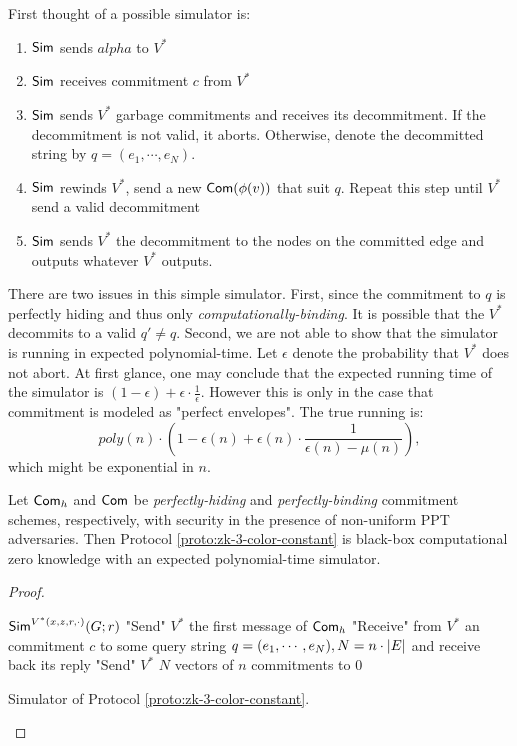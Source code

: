 \\ \\
First thought of a possible simulator is:
\begin{enumerate}
\item ${\sf Sim}$ sends $alpha$ to $V^*$
\item ${\sf Sim}$ receives commitment $c$ from $V^*$
\item ${\sf Sim}$ sends $V^*$ garbage commitments and receives its decommitment. If the decommitment is not valid, it aborts. Otherwise, denote the decommitted string by 
$q=(e_1,\cdots,e_N)$.
\item ${\sf Sim}$ rewinds $V^*$, send a new ${\sf Com}(\phi(v))$ that suit $q$. Repeat this step until $V^*$ send a valid decommitment
\item ${\sf Sim}$ sends $V^*$ the decommitment to the nodes on the committed edge and outputs whatever $V^*$ outputs.
\end{enumerate}
There are two issues in this simple simulator. First, since the commitment to $q$ is perfectly hiding and thus only {\it computationally-binding}. It is possible that the $V^*$ decommits to a valid $q'\neq q$. Second, we are not able to show that the simulator is running in expected polynomial-time. Let $\epsilon$ denote the probability that $V^*$ does not abort. At first glance, one may conclude that the expected running time of the simulator is $(1-\epsilon)+\epsilon\cdot\frac{1}{\epsilon}$. However this is only in the case that commitment is modeled as "perfect envelopes". The true running is:
$$poly(n)\cdot(1-\epsilon(n)+\epsilon(n)\cdot\frac{1}{\epsilon(n)-\mu(n)}),$$
which might be exponential in $n$.
\begin{theorem} Let ${\sf Com}_h$ and ${\sf Com}$ be {\it perfectly-hiding} and {\it perfectly-binding} commitment schemes, respectively, with security in the presence of non-uniform PPT adversaries. Then Protocol \ref{proto:zk-3-color-constant} is black-box computational zero knowledge with an expected polynomial-time simulator.
\end{theorem}
\begin{proof}

\begin{algorithm}
${\sf Sim}^{V^*(x,z,r,\cdot)}(G;r)$\;
"Send" $V^*$ the first message of ${\sf Com}_h$\;
"Receive" from $V^*$ an commitment $c$ to some query string $q=(e_1,\cdots,e_N),N=n\cdot\left|E\right|$ and receive back its reply\;
"Send" $V^*$ $N$ vectors of $n$ commitments to $0$\;

\caption{Simulator of Protocol \ref{proto:zk-3-color-constant}.} \label{alg:zk-3-color-constant-sim}
\end{algorithm}

\end{proof}


\nocite{*} 